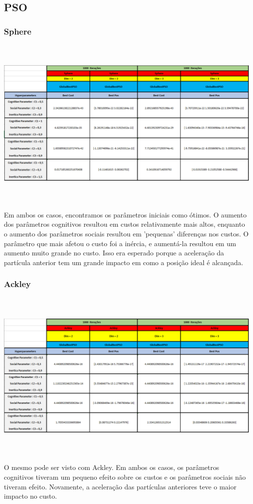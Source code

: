 \documentclass[10pt]{article}
\begin{document}
\subsection{PSO}\label{sec:PSO-res}
\subsubsection{Sphere}\label{sec:comp-PSO:center}
\begin{center}
  \includegraphics[height=8.5cm]{img/PSOsphere.png}
\end{center}
Em ambos os casos, encontramos os parâmetros iniciais como ótimos.
O aumento dos parâmetros cognitivos resultou em custos 
relativamente mais altos, enquanto o aumento dos parâmetros 
sociais resultou em 'pequenas' diferenças nos custos. O parâmetro 
que mais afetou o custo foi a inércia, e aumentá-la resultou em 
um aumento muito grande no custo. Isso era esperado porque a 
aceleração da partícula anterior tem um grande impacto em como 
a posição ideal é alcançada.

\subsubsection{Ackley}\label{sec:PSO-Ackley}
\begin{center}
  \includegraphics[height=8.5cm]{img/PSOackley.png}
\end{center}
O mesmo pode ser visto com Ackley. Em ambos os casos, os parâmetros
cognitivos tiveram um pequeno efeito sobre os custos e os 
parâmetros sociais não tiveram efeito. Novamente, a aceleração 
das partículas anteriores teve o maior impacto no custo.
\end{document}
